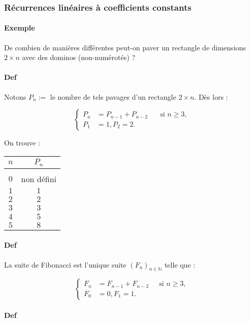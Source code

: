 \documentclass{article}
\begin{document}
			\subsubsection{Récurrences linéaires à coefficients constants}
			
			\paragraph{Exemple} De combien de manières différentes peut-on paver un rectangle de dimensions $2 \times n$ avec des dominos (non-numérotés) ?

			\paragraph{Def} Notons $P_n := $ le nombre de tels pavages d'un rectangle $2 \times n$. Dès lors :

			\[\left\{\begin{aligned}
				P_n &= P_{n-1} + P_{n-2} \;\;\;\;\; \text{ si $n \geq 3$}, \\
				P_1 &= 1, P_2 = 2.
			\end{aligned}\right.\]

			On trouve :

			\begin{center}\begin{tabular}{c|c}
				$n$ & $P_n$ \\
				\hline \\
				$0$ & non défini \\
				$1$ & $1$ \\
				$2$ & $2$ \\
				$3$ & $3$ \\
				$4$ & $5$ \\
				$5$ & $8$
			\end{tabular}\end{center}

			\paragraph{Def} La suite de Fibonacci est l'unique suite $(F_n)_{n \in \mathbb N}$ telle que :

			\[\left\{\begin{aligned}
				F_n &= F_{n-1} + F_{n-2} \;\;\;\;\text{ si $n \geq 3$}, \\
				F_0 &= 0, F_1 = 1.
			\end{aligned}\right.\]

			\paragraph{Def}
			
\end{document}
